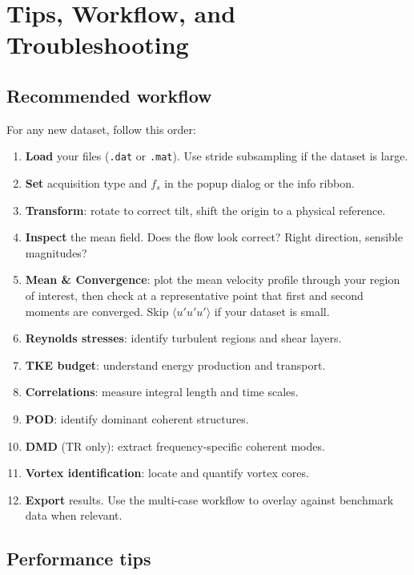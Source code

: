 \chapter{Tips, Workflow, and Troubleshooting}

\section{Recommended workflow}

For any new dataset, follow this order:

\begin{enumerate}[leftmargin=1.5em]
  \item \textbf{Load} your files (\texttt{.dat} or \texttt{.mat}). Use stride subsampling if the dataset is large.
  \item \textbf{Set} acquisition type and $f_s$ in the popup dialog or the info ribbon.
  \item \textbf{Transform}: rotate to correct tilt, shift the origin to a physical reference.
  \item \textbf{Inspect} the mean field. Does the flow look correct? Right direction, sensible magnitudes?
  \item \textbf{Mean \& Convergence}: plot the mean velocity profile through your region of interest, then check at a representative point that first and second moments are converged. Skip $\langle u'u'u' \rangle$ if your dataset is small.
  \item \textbf{Reynolds stresses}: identify turbulent regions and shear layers.
  \item \textbf{TKE budget}: understand energy production and transport.
  \item \textbf{Correlations}: measure integral length and time scales.
  \item \textbf{POD}: identify dominant coherent structures.
  \item \textbf{DMD} (TR only): extract frequency-specific coherent modes.
  \item \textbf{Vortex identification}: locate and quantify vortex cores.
  \item \textbf{Export} results. Use the multi-case workflow to overlay against benchmark data when relevant.
\end{enumerate}

\section{Performance tips}

